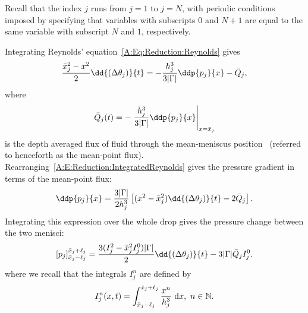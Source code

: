 \begin{subappendices}
Recall that the index $j$ runs from $j = 1$ to $j = N$, with periodic conditions imposed by specifying that variables with subscripts $0$ and $N+1$ are equal to the same variable with subscript $N$ and $1$, respectively.

Integrating Reynolds' equation~\eqref{A:Eq:Reduction:Reynolds} gives\begin{equation}\label{A:E:Reduction:IntegratedReynolds}
\frac{\xbar_j^2 - x^2}{2}\dd{(\dthetaj)}{t}  =-\frac{h_j^3}{3|\Gamma|}\ddp{p_j}{x} - \bar{Q}_j,
\end{equation}
where
\begin{equation}\label{A:E:Reduction:MidptFlux}
\bar{Q}_j(t) =- \left.\frac{\bar{h}_j^3}{3|\Gamma|}\ddp{p_j}{x}\right|_{x = \xbar_j}
\end{equation}
is the depth averaged flux of fluid through the mean-meniscus position~\citep{Leal2007} (referred to henceforth as the mean-point flux). Rearranging~\eqref{A:E:Reduction:IntegratedReynolds} gives the pressure gradient in terms of the mean-point flux:
\begin{equation}\label{A:E:Reduction:PressureGradient}
\ddp{p_j}{x} = \frac{3|\Gamma|}{2h_j^3}\left[(x^2 - \xbar_j^2) \dd{(\dthetaj)}{t} - 2\bar{Q}_j\right].
\end{equation}
Integrating this expression  over the whole drop gives the pressure change between the two menisci:
\begin{equation}\label{A:E:Reduction:PressureJump1}
\left[p_j\right]^{\xbar_j + \ell_j}
_{\xbar_j - \ell_j}= \frac{3(I^2_j - \xbar_j^2 I^0_j)|\Gamma|}{2}\dd{(\dthetaj)}{t} - 3|\Gamma|\bar{Q}_j I^0_j.
\end{equation}
where we recall that the integrals $I_j^n$ are defined by
\begin{equation}\label{A:E:Reduction:InDefinition}
I_j^n(x,t) = \int_{\bar{x}_j - \ell_j}^{\bar{x}_j + \ell_j} \frac{x^n}{h_j^3}~\mathrm{d}x, ~n \in \mathbb{N}.
\end{equation}


\end{subappendices}
